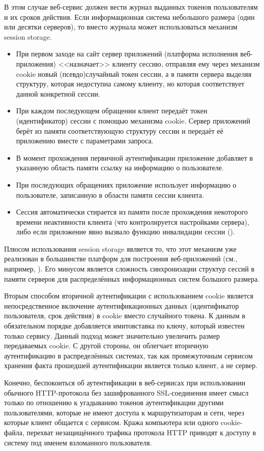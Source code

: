 В этом случае веб-сервис должен вести журнал выданных токенов пользователям и их сроков действия. Если информационная система небольшого размера (один или десятки серверов), то вместо журнала может использоваться механизм session storage.
\begin{itemize}
	\item При первом заходе на сайт сервер приложений (платформа исполнения веб-приложения) <<назначает>> клиенту сессию, отправляя ему через механизм cookie новый (псевдо)случайный токен сессии, а в памяти сервера выделяя структуру, которая недоступна самому клиенту, но которая соответствует данной конкретной сессии.
	\item При каждом последующем обращении клиент передаёт токен (идентификатор) сессии с помощью механизма cookie. Сервер приложений берёт из памяти соответствующую структуру сессии и передаёт её приложению вместе с параметрами запроса.
	\item В момент прохождения первичной аутентификации приложение добавляет в указанную область памяти ссылку на информацию о пользователе.
	\item При последующих обращениях приложение использует информацию о пользователе, записанную в области памяти сессии клиента.
	\item Сессия автоматически стирается из памяти после прохождения некоторого времени неактивности клиента (что контролируется настройками сервера), либо если приложение явно вызвало функцию инвалидации сессии ().
\end{itemize}

Плюсом использования session storage является то, что этот механизм уже реализован в большинстве платформ для построения веб-приложений (см., например, \cite[Controlling sessions]{Brittain:Darwin:2007}). Его минусом является сложность синхронизации структур сессий в памяти серверов для распределённых информационных систем большого размера.

Вторым способом вторичной аутентификации с использованием cookie является непосредственное включение аутентификационных данных (идентификатор пользователя, срок действия) в cookie вместо случайного токена. К данным в обязательном порядке добавляется имитовставка по ключу, который известен только сервису. Данный подход может значительно увеличить размер передаваемых cookie. С другой стороны, он облегчает вторичную аутентификацию в распределённых системах, так как промежуточным сервисом хранения факта прошедшей аутентификации является только клиент, а не сервер.

Конечно, беспокоиться об аутентификации в веб-сервисах при использовании обычного HTTP-протокола без зашифрованного SSL-соединения имеет смысл только по отношению к угадыванию токенов аутентификации другими пользователями, которые не имеют доступа к маршрутизаторам и сети, через которые клиент общается с сервисом. Кража компьютера или одного cookie-файла, перехват незащищённого трафика протокола HTTP приводят к доступу в систему под именем взломанного пользователя.
